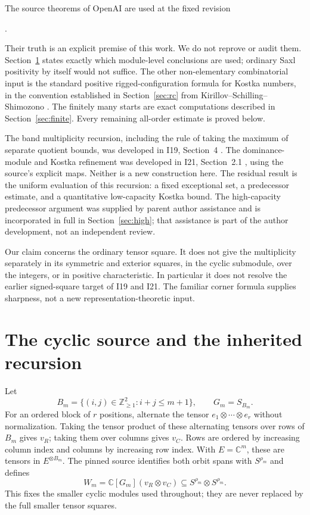 \documentclass[11pt]{article}
\theoremstyle{remark}\newtheorem{remark}[theorem]{Remark}
\newcommand{\C}{\mathbb C}\newcommand{\Z}{\mathbb Z}
\numberwithin{equation}{section}\setlength{\emergencystretch}{2em}
\begin{document}
The source theorems of OpenAI \cite{cyclic,universal} are used at the fixed
revision
\begin{center}\small{}.\end{center}
Their truth is an explicit premise of this work. We do not reprove or audit
them. Section~\ref{sec:source} states exactly which module-level conclusions
are used; ordinary Saxl positivity by itself would not suffice.
The other non-elementary combinatorial input is the standard positive
rigged-configuration formula for Kostka numbers, in the convention established
in Section~\ref{sec:rc} from Kirillov--Schilling--Shimozono \cite{KSS}.
The finitely many starts are exact computations described in
Section~\ref{sec:finite}. Every remaining all-order estimate is proved below.

The band multiplicity recursion, including the rule of taking the maximum
of separate quotient bounds, was developed in I19, Section~4 \cite{I19}.
The dominance-module and Kostka refinement was developed in I21,
Section~2.1 \cite{I21}, using the source's explicit maps. Neither is a new
construction here. The residual result is the uniform evaluation of this
recursion: a fixed exceptional set, a predecessor estimate, and a quantitative
low-capacity Kostka bound. The high-capacity predecessor argument was supplied
by parent author assistance and is incorporated in full in
Section~\ref{sec:high}; that assistance is part of the author development,
not an independent review.

Our claim concerns the ordinary tensor square. It does not give the
multiplicity separately in its symmetric and exterior squares, in the
cyclic submodule, over the integers, or in positive characteristic.
In particular it does not resolve the earlier signed-square target of
I19 and I21. The familiar corner formula supplies sharpness, not a new
representation-theoretic input.

\section{The cyclic source and the inherited recursion}\label{sec:source}
Let
\[
 B_m=\{(i,j)\in\Z_{\ge1}^2:i+j\le m+1\},\qquad G_m=S_{B_m}.
\]
For an ordered block of $r$ positions, alternate the tensor
$e_1\otimes\cdots\otimes e_r$ without normalization. Taking the tensor
product of these alternating tensors over rows of $B_m$ gives $v_R$;
taking them over columns gives $v_C$. Rows are ordered by increasing
column index and columns by increasing row index. With $E=\C^m$,
these are tensors in $E^{\otimes B_m}$. The pinned source identifies
both orbit spans with $S^{\rho_m}$ and defines
\[
 W_m=\C[G_m](v_R\otimes v_C)\subseteq S^{\rho_m}\otimes S^{\rho_m}.
\]
This fixes the smaller cyclic modules used throughout; they are never
replaced by the full smaller tensor squares.
\end{document}
